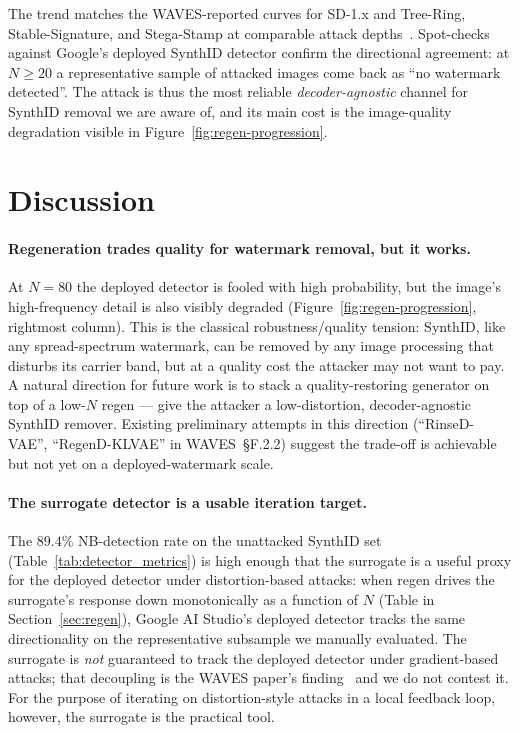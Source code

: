 \documentclass[11pt]{article}
\begin{document}
\noindent The trend matches the WAVES-reported curves for SD-1.x and
Tree-Ring, Stable-Signature, and Stega-Stamp at comparable attack
depths~\citep[\S5.3]{an2024waves}. Spot-checks against Google's deployed
SynthID detector confirm the directional agreement: at $N \ge 20$ a
representative sample of attacked images come back as
``no watermark detected''. The attack is thus the most reliable
\emph{decoder-agnostic} channel for SynthID removal we are aware of, and
its main cost is the image-quality degradation visible in
Figure~\ref{fig:regen-progression}.

\section{Discussion}
\label{sec:discussion}

\paragraph{Regeneration trades quality for watermark removal, but it
works.}
At $N{=}80$ the deployed detector is fooled with high probability, but the
image's high-frequency detail is also visibly degraded
(Figure~\ref{fig:regen-progression}, rightmost column). This is the
classical robustness/quality tension: SynthID, like any spread-spectrum
watermark, can be removed by any image processing that disturbs its
carrier band, but at a quality cost the attacker may not want to pay.
A natural direction for future work is to stack a quality-restoring
generator on top of a low-$N$ regen --- give the attacker a
low-distortion, decoder-agnostic SynthID remover. Existing preliminary
attempts in this direction (``RinseD-VAE'', ``RegenD-KLVAE'' in
WAVES~\S F.2.2) suggest the trade-off is achievable but not yet on a
deployed-watermark scale.

\paragraph{The surrogate detector is a usable iteration target.}
The $89.4\%$ NB-detection rate on the unattacked SynthID set
(Table~\ref{tab:detector_metrics}) is high enough that the surrogate is
a useful proxy for the deployed detector under distortion-based attacks:
when regen drives the surrogate's response down monotonically as a
function of $N$ (Table in Section~\ref{sec:regen}), Google AI Studio's
deployed detector tracks the same directionality on the
representative subsample we manually evaluated. The surrogate is
\emph{not} guaranteed to track the deployed detector under gradient-based
attacks; that decoupling is the WAVES paper's
finding~\citep[\S F.3.2]{an2024waves} and we do not contest it. For the
purpose of iterating on distortion-style attacks in a local feedback loop,
however, the surrogate is the practical tool.
\end{document}
